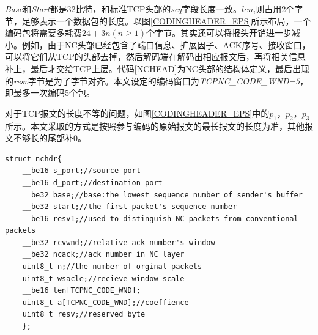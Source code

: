\par
\emph{Base}和\emph{Start}都是32比特，和标准TCP头部的\emph{seq}字段长度一致。$len_{i}$则占用2个字节，足够表示一个数据包的长度。以图\ref{CODINGHEADER_EPS}所示布局，一个编码包将需要多耗费$24+3n\left(n \ge 1\right)$个字节。其实还可以将报头开销进一步减小。例如，由于NC头部已经包含了端口信息、扩展因子、ACK序号、接收窗口，可以将它们从TCP的头部去掉，然后解码端在解码出相应报文后，再将相关信息补上，最后才交给TCP上层。代码\ref{NCHEAD}为NC头部的结构体定义，最后出现的\emph{resv}字节是为了字节对齐。本文设定的编码窗口为\emph{TCPNC\_CODE\_WND=5}，即最多一次编码5个包。
\par
对于TCP报文的长度不等的问题，如图\ref{CODINGHEADER_EPS}中的$p_{1}$，$p_{2}$，$p_{3}$所示。本文采取的方式是按照参与编码的原始报文的最长报文的长度为准，其他报文不够长的尾部补0。
	\begin{lstlisting}[float,caption=NC头部结构,label={NCHEAD},language={[ANSI]C}]
	struct nchdr{
	__be16 s_port;//source port
	__be16 d_port;//destination port
	__be32 base;//base:the lowest sequence number of sender's buffer
	__be32 start;//the first packet's sequence number
	__be16 resv1;//used to distinguish NC packets from conventional packets
	__be32 rcvwnd;//relative ack number's window
	__be32 ncack;//ack number in NC layer
	uint8_t n;//the number of orginal packets
	uint8_t wsacle;//recieve window scale
	__be16 len[TCPNC_CODE_WND];
	uint8_t a[TCPNC_CODE_WND];//coeffience
	uint8_t resv;//reserved byte
	};
	\end{lstlisting}
